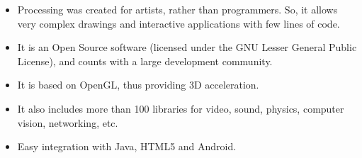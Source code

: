 \begin{itemize}
\item Processing was created for artists, rather than programmers. So, it allows very complex drawings and interactive applications with few lines of code.
\item It is an Open Source software (licensed under the GNU Lesser General Public License), and counts with a large development community.
\item It is based on OpenGL, thus providing 3D acceleration.
\item It also includes more than 100 libraries for video, sound, physics, computer vision, networking, etc.
\item Easy integration with Java, HTML5 and Android.
\end{itemize}

